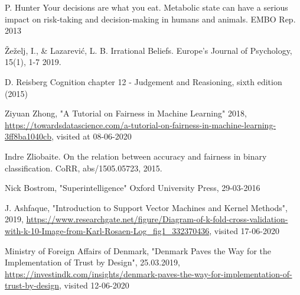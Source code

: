 \documentclass[11pt, fleqn, titlepage]{article}
\begin{document}
\begin{thebibliography}{9}
		 P. Hunter Your decisions are what you eat. Metabolic state can have a serious impact on risk-taking and decision-making in humans and animals. EMBO Rep. 2013
		
		 Žeželj, I., \& Lazarević, L. B.  Irrational Beliefs. Europe’s Journal of Psychology, 15(1), 1-7 2019.
		
		 D. Reisberg Cognition chapter 12 - Judgement and Reasioning, sixth edition (2015)
		
		 Ziyuan Zhong, "A Tutorial on Fairness in Machine Learning" 2018, \url{https://towardsdatascience.com/a-tutorial-on-fairness-in-machine-learning-3ff8ba1040cb}, visited at 08-06-2020
		
		 Indre Zliobaite. On the relation between accuracy and fairness in binary classification. CoRR, abs/1505.05723, 2015.
		
		 Nick Bostrom, "Superintelligence" Oxford University Press, 29-03-2016
		
		 J. Ashfaque, "Introduction to Support Vector Machines and Kernel Methods", 2019, \url{https://www.researchgate.net/figure/Diagram-of-k-fold-cross-validation-with-k-10-Image-from-Karl-Rosaen-Log_fig1_332370436}, visited 17-06-2020
		
		 Ministry of Foreign Affairs of Denmark, "Denmark Paves the Way for the Implementation of Trust by Design", 25.03.2019, \url{https://investindk.com/insights/denmark-paves-the-way-for-implementation-of-trust-by-design}, visited 12-06-2020
		
	\end{thebibliography}
	
	
	\newpage
	
	
\end{document}
